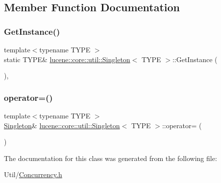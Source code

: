 \subsection{Member Function Documentation}
\mbox{\label{classlucene_1_1core_1_1util_1_1Singleton_a5e8079ebbaae97438a52c449ee92aafa}} 
\subsubsection{\texorpdfstring{Get\+Instance()}{GetInstance()}}
{\footnotesize\ttfamily template$<$typename T\+Y\+PE $>$ \\
static T\+Y\+PE\& \mbox{\hyperlink{classlucene_1_1core_1_1util_1_1Singleton}{lucene\+::core\+::util\+::\+Singleton}}$<$ T\+Y\+PE $>$\+::Get\+Instance (\begin{DoxyParamCaption}{ }\end{DoxyParamCaption})\hspace{0.3cm}{\ttfamily [inline]}, {\ttfamily [static]}}

\mbox{\label{classlucene_1_1core_1_1util_1_1Singleton_abec7d88a0f754dfa66438cc76e4c5fd5}} 
\subsubsection{\texorpdfstring{operator=()}{operator=()}}
{\footnotesize\ttfamily template$<$typename T\+Y\+PE $>$ \\
\mbox{\hyperlink{classlucene_1_1core_1_1util_1_1Singleton}{Singleton}}\& \mbox{\hyperlink{classlucene_1_1core_1_1util_1_1Singleton}{lucene\+::core\+::util\+::\+Singleton}}$<$ T\+Y\+PE $>$\+::operator= (\begin{DoxyParamCaption}\item[{\mbox{\hyperlink{ZlibCrc32_8h_a2c212835823e3c54a8ab6d95c652660e}{const}} \mbox{\hyperlink{classlucene_1_1core_1_1util_1_1Singleton}{Singleton}}$<$ T\+Y\+PE $>$ \&}]{ }\end{DoxyParamCaption})\hspace{0.3cm}{\ttfamily [delete]}}



The documentation for this class was generated from the following file\+:\begin{DoxyCompactItemize}
\item 
Util/\mbox{\hyperlink{Concurrency_8h}{Concurrency.\+h}}\end{DoxyCompactItemize}
